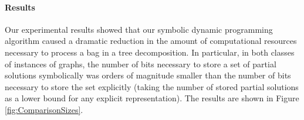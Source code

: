

\paragraph*{Results}

Our experimental results showed that our symbolic dynamic programming algorithm caused a dramatic reduction in the amount of computational resources necessary to process a bag in a tree decomposition. In particular, in both classes of instances of graphs, the number of bits necessary to store a set of partial solutions symbolically was orders of magnitude smaller than the number of bits necessary to store the set explicitly (taking the number of stored partial solutions as a lower bound for any explicit representation). The results are shown in Figure \ref{fig:ComparisonSizes}. 


